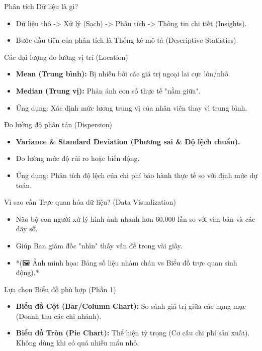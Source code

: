 \documentclass[aspectratio=169]{beamer}
\begin{document}
\begin{frame}{Phân tích Dữ liệu là gì?}
    \begin{itemize}
        \item Dữ liệu thô -> Xử lý (Sạch) -> Phân tích -> Thông tin chi tiết (Insights).
        \item Bước đầu tiên của phân tích là Thống kê mô tả (Descriptive Statistics).
    \end{itemize}
\end{frame}


\begin{frame}{Các đại lượng đo lường vị trí (Location)}
    \begin{itemize}
        \item \textbf{Mean (Trung bình):} Bị nhiễu bởi các giá trị ngoại lai cực lớn/nhỏ.
        \item \textbf{Median (Trung vị):} Phản ánh con số thực tế "nằm giữa".
        \item Ứng dụng: Xác định mức lương trung vị của nhân viên thay vì trung bình.
    \end{itemize}
\end{frame}


\begin{frame}{Đo lường độ phân tán (Dispersion)}
    \begin{itemize}
        \item \textbf{Variance \& Standard Deviation (Phương sai \& Độ lệch chuẩn).}
        \item Đo lường mức độ rủi ro hoặc biến động.
        \item Ứng dụng: Phân tích độ lệch của chi phí bảo hành thực tế so với định mức dự toán.
    \end{itemize}
\end{frame}


\begin{frame}{Vì sao cần Trực quan hóa dữ liệu? (Data Visualization)}
    \begin{itemize}
        \item Não bộ con người xử lý hình ảnh nhanh hơn 60.000 lần so với văn bản và các dãy số.
        \item Giúp Ban giám đốc "nhìn" thấy vấn đề trong vài giây.
        \item *(🖼️ Ảnh minh họa: Bảng số liệu nhàm chán vs Biểu đồ trực quan sinh động).*
    \end{itemize}
\end{frame}


\begin{frame}{Lựa chọn Biểu đồ phù hợp (Phần 1)}
    \begin{itemize}
        \item \textbf{Biểu đồ Cột (Bar/Column Chart):} So sánh giá trị giữa các hạng mục (Doanh thu các chi nhánh).
        \item \textbf{Biểu đồ Tròn (Pie Chart):} Thể hiện tỷ trọng (Cơ cấu chi phí sản xuất). Không dùng khi có quá nhiều mẩu nhỏ.
    \end{itemize}
\end{frame}
\end{document}
